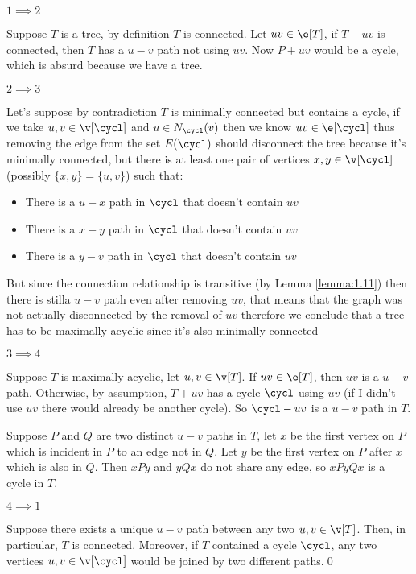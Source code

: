 \begin{prf}
    \boldmath$1 \implies 2$\unboldmath

    Suppose $T$ is a tree, by definition $T$ is connected. Let $uv \in \e[T]$, if $T - uv$ is connected, then $T$ has a $u - v$ path not using $uv$. Now $P + uv$ would be a cycle, which is absurd because we have a tree.

    \boldmath$2 \implies 3$\unboldmath

    Let's suppose by contradiction $T$ is minimally connected but contains a cycle, if we take $u, v \in \v[\cycl]$ and $u \in N_{\cycl}(v)$ then we know $uv \in \e[\cycl]$ thus removing the edge from the set $E(\cycl)$ should disconnect the tree because it's minimally connected, but there is at least one pair of vertices $x, y \in \v[\cycl]$ (possibly $\{x, y\} = \{u, v\}$) such that:
    \begin{itemize}
        \item There is a $u - x$ path in $\cycl$ that doesn't contain $uv$
        \item There is a $x - y$ path in $\cycl$ that doesn't contain $uv$
        \item There is a $y - v$ path in $\cycl$ that doesn't contain $uv$
    \end{itemize}
    But since the connection relationship is transitive (by Lemma \ref{lemma:1.11}) then there is stilla $u - v$ path even after removing $uv$, that means that the graph was not actually disconnected by the removal of $uv$ therefore we conclude that a tree has to be maximally acyclic since it's also minimally connected

    \boldmath$3 \implies 4$\unboldmath

    Suppose $T$ is maximally acyclic, let $u, v \in \v[T]$. If $uv \in \e[T]$, then $uv$ is a $u - v$ path. Otherwise, by assumption, $T + uv$ has a cycle $\cycl$ using $uv$ (if I didn't use $uv$ there would already be another cycle). So $\cycl - uv$ is a $u - v$ path in $T$.

    Suppose $P$ and $Q$ are two distinct $u - v$ paths in $T$, let $x$ be the first vertex on $P$ which is incident in $P$ to an edge not in $Q$. Let $y$ be the first vertex on $P$ after $x$ which is also in $Q$. Then $xPy$ and $yQx$ do not share any edge, so $xPyQx$ is a cycle in $T$.

    \boldmath$4 \implies 1$\unboldmath

    Suppose there exists a unique $u - v$ path between any two $u, v \in \v[T]$. Then, in particular, $T$ is connected. Moreover, if $T$ contained a cycle $\cycl$, any two vertices $u, v \in \v[\cycl]$ would be joined by two different paths.\qed
\end{prf}
